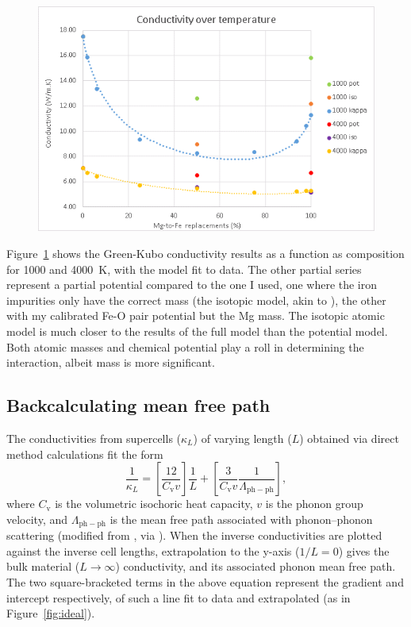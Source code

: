\begin{figure}[h!]
  \includegraphics[width=\linewidth]{Figures/kc_iso_pot_full.png}
  \caption[kc iso pot full]{}
  \label{kc_iso_pot_full}
\end{figure}

Figure~\ref{kc_iso_pot_full} shows the Green-Kubo conductivity results as a function as composition for 1000 and 4000~K, with the model fit to data. The other partial series represent a partial potential compared to the one I used, one where the iron impurities only have the correct mass (the isotopic model, akin to \citet{Ammann2014}), the other with my calibrated Fe-O pair potential but the Mg mass. The isotopic atomic model is much closer to the results of the full model than the potential model. Both atomic masses and chemical potential play a roll in determining the interaction, albeit mass is more significant. 

\pagebreak

\subsection{Backcalculating mean free path}

The conductivities from supercells ($\kappa_{L}$) of varying length ($L$) obtained via direct method calculations fit the form
%
\begin{equation} 
\frac{1}{\kappa_{L}}=\left [ \frac{12}{C_{\mathrm{v}}v} \right ]\frac{1}{L}+\left [ \frac{3}{C_{\mathrm{v}}v} \frac{1}{\Lambda_{\mathrm{ph-ph}}} \right ],
\label{eq.ss2010.28}
\end{equation}
%
where $C_{\mathrm{v}}$ is the volumetric isochoric heat capacity, $v$ is the phonon group velocity, and $\Lambda_{\mathrm{ph-ph}}$ is the mean free path associated with phonon--phonon scattering (modified from \cite{Schelling2002}, via \cite{Stackhouse2010}). When the inverse conductivities are plotted against the inverse cell lengths, extrapolation to the y-axis ($1/L = 0$) gives the bulk material ($L\rightarrow \infty$) conductivity, and its associated phonon mean free path. The two square-bracketed terms in the above equation represent the gradient and intercept respectively, of such a line fit to data and extrapolated (as in Figure~\ref{fig:ideal}). 

